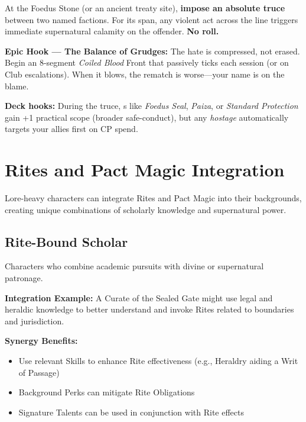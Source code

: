 \begin{tcolorbox}[enhanced,sharp corners,boxrule=.6pt,title={Talent — The Law That Binds Spears (18 XP, 1/campaign)}]
At the Foedus Stone (or an ancient treaty site), \textbf{impose an absolute truce} between two named factions. For its span, any violent act across the line triggers immediate supernatural calamity on the offender. \textbf{No roll.}
\end{tcolorbox}

\textbf{Epic Hook — The Balance of Grudges:} The hate is compressed, not erased. Begin an 8-segment \emph{Coiled Blood} Front that passively ticks each session (or on Club escalations). When it blows, the rematch is worse—your name is on the blame.

\textbf{Deck hooks:} During the truce, \SuitDiamond{}s like \emph{Foedus Seal}, \emph{Paiza}, or \emph{Standard Protection} gain +1 practical scope (broader safe-conduct), but any \emph{hostage} \SuitClub{} automatically targets your allies first on CP spend.

\section{Rites and Pact Magic Integration}

Lore-heavy characters can integrate Rites and Pact Magic into their backgrounds, creating unique combinations of scholarly knowledge and supernatural power.

\subsection{Rite-Bound Scholar}
Characters who combine academic pursuits with divine or supernatural patronage.

\textbf{Integration Example:} A Curate of the Sealed Gate might use legal and heraldic knowledge to better understand and invoke Rites related to boundaries and jurisdiction.

\textbf{Synergy Benefits:}
\begin{itemize}
    \item Use relevant Skills to enhance Rite effectiveness (e.g., Heraldry aiding a Writ of Passage)
    \item Background Perks can mitigate Rite Obligations
    \item Signature Talents can be used in conjunction with Rite effects
\end{itemize}

